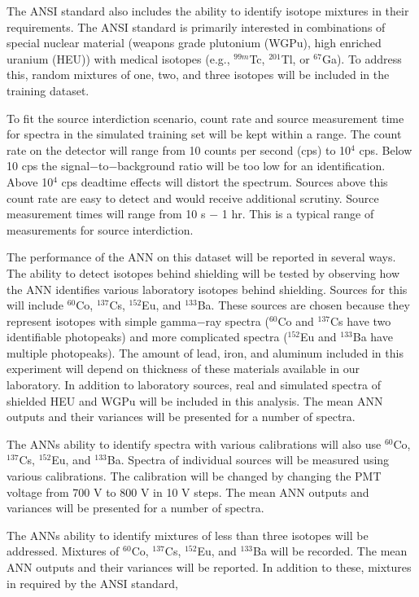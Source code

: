 \documentclass[tocnosub,noragright,centerchapter,12pt,fullpage]{uiucecethesis09}
\begin{document}
The ANSI standard also includes the ability to identify isotope mixtures in their requirements. The ANSI standard is primarily interested in combinations of special nuclear material (weapons grade plutonium (WGPu), high enriched uranium (HEU)) with medical isotopes (e.g., $^{99m}$Tc, $^{201}$Tl, or $^{67}$Ga). To address this, random mixtures of one, two, and three isotopes will be included in the training dataset.

To fit the source interdiction scenario, count rate and source measurement time for spectra in the simulated training set will be kept within a range. The count rate on the detector will range from 10 counts per second (cps) to 10$^{4}$ cps. Below 10 cps the signal$-$to$-$background ratio will be too low for an identification. Above 10$^{4}$ cps deadtime effects will distort the spectrum. Sources above this count rate are easy to detect and would receive additional scrutiny. Source measurement times will range from 10 s $-$ 1 hr. This is a typical range of measurements for source interdiction. 

The performance of the ANN on this dataset will be reported in several ways. The ability to detect isotopes behind shielding will be tested by observing how the ANN identifies various laboratory isotopes behind shielding. Sources for this will include $^{60}$Co, $^{137}$Cs, $^{152}$Eu, and $^{133}$Ba. These sources are chosen because they represent isotopes with simple gamma$-$ray spectra ($^{60}$Co and $^{137}$Cs have two identifiable photopeaks) and more complicated spectra ($^{152}$Eu and $^{133}$Ba have multiple photopeaks). The amount of lead, iron, and aluminum included in this experiment will depend on thickness of these materials available in our laboratory. In addition to laboratory sources, real and simulated spectra of shielded HEU and WGPu will be included in this analysis. The mean ANN outputs and their variances will be presented for a number of spectra. 

The ANNs ability to identify spectra with various calibrations will also use $^{60}$Co, $^{137}$Cs, $^{152}$Eu, and $^{133}$Ba. Spectra of individual sources will be measured using various calibrations. The calibration will be changed by changing the PMT voltage from 700 V to 800 V in 10 V steps. The mean ANN outputs and variances will be presented for a number of spectra. 

The ANNs ability to identify mixtures of less than three isotopes will be addressed. Mixtures of $^{60}$Co, $^{137}$Cs, $^{152}$Eu, and $^{133}$Ba will be recorded. The mean ANN outputs and their variances will be reported. In addition to these, mixtures in required by the ANSI standard, 
\end{document}
